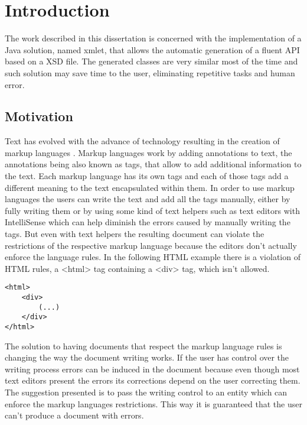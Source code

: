 \chapter{Introduction}
\label{cha:introduction}

The work described in this dissertation is concerned with the implementation of a Java solution, named xmlet, that allows the automatic generation of a fluent \ac{API} based on a \ac{XSD} file. The generated classes are very similar most of the time and such solution may save time to the user, eliminating repetitive tasks and human error.

\section{Motivation}


Text has evolved with the advance of technology resulting in the creation of markup languages \cite{markuplanguages}. Markup languages work by adding annotations to text, the annotations being also known as tags, that allow to add additional information to the text. Each markup language has its own tags and each of those tags add a different meaning to the text encapsulated within them. In order to use markup languages the users can write the text and add all the tags manually, either by fully writing them or by using some kind of text helpers such as text editors with IntelliSense which can help diminish the errors caused by manually writing the tags. But even with text helpers the resulting document can violate the restrictions of the respective markup language because the editors don't actually enforce the language rules. In the following \ac{HTML} example there is a violation of \ac{HTML} rules, a <html> tag containing a <div> tag, which isn't allowed.

\lstset{language=HTML}
\begin{lstlisting}[caption={Failed HTML rule validation},captionpos=b]
<html>
	<div>
		(...)
	</div>
</html>
\end{lstlisting}

\noindent
The solution to having documents that respect the markup language rules is changing the way the document writing works. If the user has control over the writing process errors can be induced in the document because even though most text editors present the errors its corrections depend on the user correcting them. The suggestion presented is to pass the writing control to an entity which can enforce the markup languages restrictions. This way it is guaranteed that the user can't produce a document with errors. 

